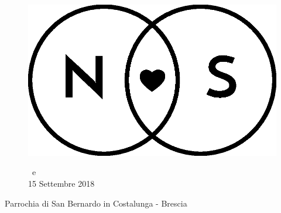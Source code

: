 \documentclass[11pt]{book}
\begin{document}
{%
\makeatletter
\let\strippt\strip@pt
\makeatother
\newcommand{\firstpageornament}{%
\unitlength=1mm 

\begin{picture}(0,0)%
\put(-19,13){\pgfornament[width=2cm]{37}}%
\put(87,13){%
\pgfornament[width=2cm,symmetry=v]{37}}%
\put(-19,-175){%
\pgfornament[width=2cm,symmetry=h]{37}}%
\put(87,-175){%
\pgfornament[width=2cm,symmetry=c]{37}}%
\end{picture}}%

}

\begin{center}
%


\begin{figure}
\vspace*{5cm}
\centering
\includegraphics[scale=0.3]{img/Logo_piccolo.eps}

\huge \NSposo \ e \NSposa\\
\large 15 Settembre 2018\\
\end{figure}
\normalsize

Parrochia di San Bernardo in Costalunga - Brescia

\end{center}
\restoregeometry
\clearpage
\afterpage{\cfoot{\thepage}}
\null\vfill
\end{document}

